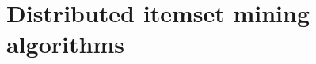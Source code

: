 \documentclass[preprint,review,12pt]{elsarticle}
\begin{document}
%


\section{Distributed itemset mining algorithms}
\label{algorithms}
\end{document}
